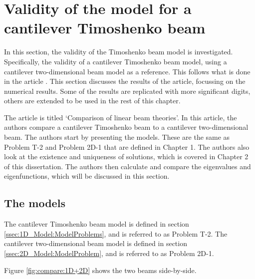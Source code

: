 \documentclass[../../main.tex]{subfiles}
\begin{document}
\section{Validity of the model for a cantilever Timoshenko beam} \label{sec:validity-of-a-cantilever-timoshenko-beam}

In this section, the validity of the Timoshenko beam model is investigated. Specifically, the validity of a cantilever Timoshenko beam model, using a cantilever two-dimensional beam model as a reference. This follows what is done in the article \cite{LVV09}. This section discusses the results of the article, focussing on the numerical results. Some of the results are replicated with more significant digits, others are extended to be used in the rest of this chapter.

The article \cite{LVV09} is titled `Comparison of linear beam theories'. In this article, the authors compare a cantilever Timoshenko beam to a cantilever two-dimensional beam. The authors start by presenting the models. These are the same as Problem T-2 and Problem 2D-1 that are defined in Chapter 1. The authors also look at the existence and uniqueness of solutions, which is covered in Chapter 2 of this dissertation. The authors then calculate and compare the eigenvalues and eigenfunctions, which will be discussed in this section.

\subsection{The models}
The cantilever Timoshenko beam model is defined in section \ref{ssec:1D_Model:ModelProblems}, and is referred to as Problem T-2. The cantilever two-dimensional beam model is defined in section \ref{ssec:2D_Model:ModelProblem}, and is referred to as Problem 2D-1.

Figure \ref{fig:compare:1D+2D} shows the two beams side-by-side.
\end{document}
